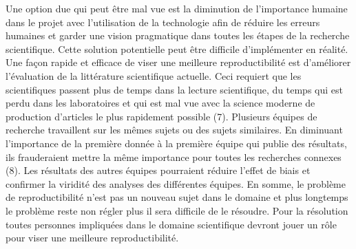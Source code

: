 \documentclass[9pt,twocolumn,twoside,]{pnas-new}
\begin{document}
Une option due qui peut être mal vue est la diminution de l'importance
humaine dans le projet avec l'utilisation de la technologie afin de
réduire les erreurs humaines et garder une vision pragmatique dans
toutes les étapes de la recherche scientifique. Cette solution
potentielle peut être difficile d'implémenter en réalité. Une façon
rapide et efficace de viser une meilleure reproductibilité est
d'améliorer l'évaluation de la littérature scientifique actuelle. Ceci
requiert que les scientifiques passent plus de temps dans la lecture
scientifique, du temps qui est perdu dans les laboratoires et qui est
mal vue avec la science moderne de production d'articles le plus
rapidement possible (7). Plusieurs équipes de recherche travaillent sur
les mêmes sujets ou des sujets similaires. En diminuant l'importance de
la première donnée à la première équipe qui publie des résultats, ils
frauderaient mettre la même importance pour toutes les recherches
connexes (8). Les résultats des autres équipes pourraient réduire
l'effet de biais et confirmer la viridité des analyses des différentes
équipes. En somme, le problème de reproductibilité n'est pas un nouveau
sujet dans le domaine et plus longtemps le problème reste non régler
plus il sera difficile de le résoudre. Pour la résolution toutes
personnes impliquées dans le domaine scientifique devront jouer un rôle
pour viser une meilleure reproductibilité.

\pnasbreak
\end{document}

